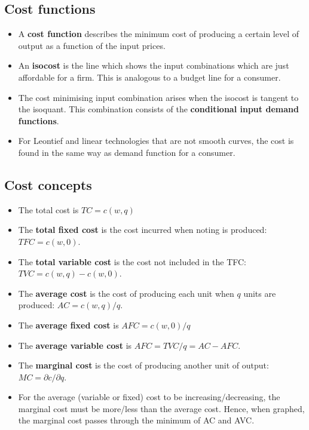 \documentclass[a4paper]{article}
\begin{document}
\subsection{Cost functions}
\begin{itemize}
    \item A \textbf{cost function} describes the minimum cost of producing a certain level of output as a function of the input prices. 
    \item An \textbf{isocost} is the line which shows the input combinations which are just affordable for a firm. This is analogous to a budget line for a consumer.
    \item The cost minimising input combination arises when the isocost is tangent to the isoquant. This combination consists of the \textbf{conditional input demand functions}.
    \item For Leontief and linear technologies that are not smooth curves, the cost is found in the same way as demand function for a consumer.
\end{itemize}

\subsection{Cost concepts}
\begin{itemize}
    \item The total cost is $TC = c(w, q)$
    \item The \textbf{total fixed cost} is the cost incurred when noting is produced: $TFC = c(w, 0)$.
    \item The \textbf{total variable cost} is the cost not included in the TFC: $TVC = c(w,q) - c(w, 0)$. 
    \item The \textbf{average cost} is the cost of producing each unit when $q$ units are produced: $AC = c(w, q)/q$.
    \item The \textbf{average fixed cost} is $AFC = c(w, 0)/q$
    \item The \textbf{average variable cost} is $AFC = TVC/q = AC - AFC$.
    \item The \textbf{marginal cost} is the cost of producing another unit of output: $MC = \partial c / \partial q$. 
    \item For the average (variable or fixed) cost to be increasing/decreasing, the marginal cost must be more/less than the average cost. Hence, when graphed, the marginal cost passes through the minimum of AC and AVC.
\end{itemize}
\end{document}
